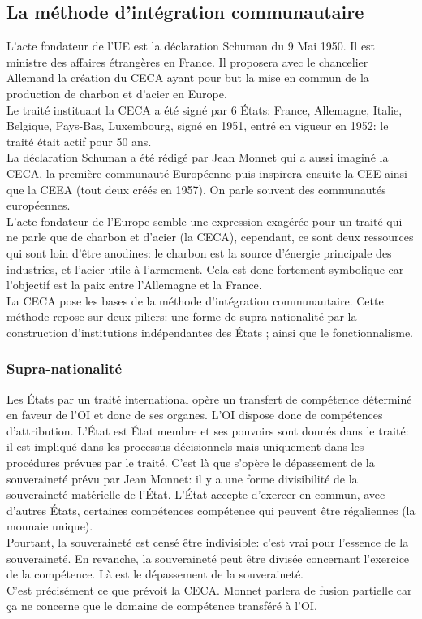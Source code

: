 \documentclass[12pt, a4paper, openany]{book}
\begin{document}
\subsection{La méthode d'intégration communautaire}
L'acte fondateur de l'UE est la déclaration Schuman du 9 Mai 1950. Il est ministre des affaires étrangères en France. Il proposera avec le chancelier Allemand la création du CECA ayant pour but la mise en commun de la production de charbon et d'acier en Europe. \\
Le traité instituant la CECA a été signé par 6 États: France, Allemagne, Italie, Belgique, Pays-Bas, Luxembourg, signé en 1951, entré en vigueur en 1952: le traité était actif pour 50 ans. \\
La déclaration Schuman a été rédigé par Jean Monnet qui a aussi imaginé la CECA, la première communauté Européenne puis inspirera ensuite la CEE ainsi que la CEEA (tout deux créés en 1957). On parle souvent des communautés européennes. \\
L'acte fondateur de l'Europe semble une expression exagérée pour un traité qui ne parle que de charbon et d'acier (la CECA), cependant, ce sont deux ressources qui sont loin d'être anodines: le charbon est la source d'énergie principale des industries, et l'acier utile à l'armement. Cela est donc fortement symbolique car l'objectif est la paix entre l'Allemagne et la France. \\
La CECA pose les bases de la méthode d'intégration communautaire. Cette méthode repose sur deux piliers: une forme de supra-nationalité par la construction d'institutions indépendantes des États ; ainsi que le fonctionnalisme.

\subsubsection{Supra-nationalité}

Les États par un traité international opère un transfert de compétence déterminé en faveur de l'OI et donc de ses organes. L'OI dispose donc de compétences d'attribution. L'État est État membre et ses pouvoirs sont donnés dans le traité: il est impliqué dans les processus décisionnels mais uniquement dans les procédures prévues par le traité. C'est là que s'opère le dépassement de la souveraineté prévu par Jean Monnet: il y a une forme divisibilité de la souveraineté matérielle de l'État. L'État accepte d'exercer en commun, avec d'autres États, certaines compétences compétence qui peuvent être régaliennes (la monnaie unique). \\
Pourtant, la souveraineté est censé être indivisible: c'est vrai pour l'essence de la souveraineté. En revanche, la souveraineté peut être divisée concernant l'exercice de la compétence. Là est le dépassement de la souveraineté. \\
C'est précisément ce que prévoit la CECA. Monnet parlera de fusion partielle car ça ne concerne que le domaine de compétence transféré à l'OI.
\end{document}
